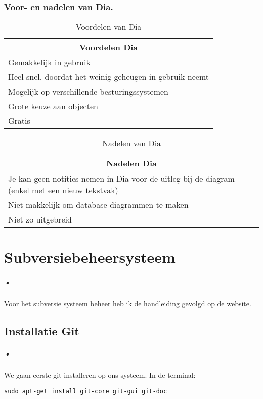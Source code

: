 \documentclass[A4Paper,11pt]{report}
\begin{document}
\subsection{Voor- en nadelen van Dia.}
\begin{table}[h]
\caption{Voordelen van Dia}
\centering
\begin{tabular}{|p{10cm}|} \hline
\multicolumn{1}{|c|}{Voordelen Dia} \\ \hline \hline
Gemakkelijk in gebruik \\  \hline
Heel snel, doordat het weinig geheugen in gebruik neemt\\  \hline
Mogelijk op verschillende besturingssystemen\\  \hline
Grote keuze aan objecten \\  \hline
Gratis \\  \hline
\end{tabular}
\end{table}
\begin{table}[h]
\caption{Nadelen van Dia}
\centering
\begin{tabular}{|p{10cm}|} \hline
\multicolumn{1}{|c|}{Nadelen Dia} \\ \hline \hline
Je kan geen notities nemen in Dia voor de uitleg bij de diagram (enkel met een nieuw tekstvak) \\  \hline
Niet makkelijk om database diagrammen te maken \\  \hline
Niet zo uitgebreid \\  \hline
\end{tabular}
\end{table}
\newpage
\appendix
\renewcommand*{\appendixname}{Bijlage}
\chapter{Subversiebeheersysteem}
\paragraph{•}
Voor het subversie systeem beheer heb ik de handleiding gevolgd op de website.
\section{Installatie Git}
\paragraph{•}
We gaan eerste git installeren op ons systeem.
In de terminal:
\begin{lstlisting}
sudo apt-get install git-core git-gui git-doc
\end{lstlisting}
\end{document}

